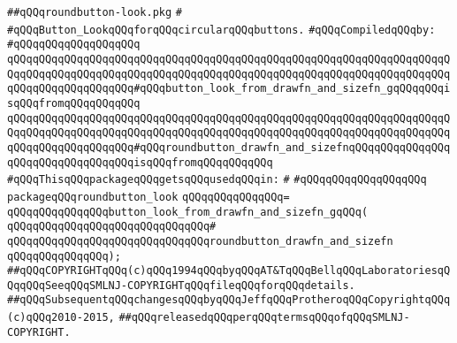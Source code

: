 \label{src/lib/x-kit/widget/old/leaf/roundbutton-look.pkg}
\verb|##qQQqroundbutton-look.pkg|\newline
\verb|#|\newline
\verb|#qQQqButton_LookqQQqforqQQqcircularqQQqbuttons.|\newline
\newline
\verb|#qQQqCompiledqQQqby:|\newline
\verb|#qQQqqQQqqQQqqQQqqQQq|\newline
\newline
\newline
\newline
\verb|qQQqqQQqqQQqqQQqqQQqqQQqqQQqqQQqqQQqqQQqqQQqqQQqqQQqqQQqqQQqqQQqqQQqqQQqqQQqqQQqqQQqqQQqqQQqqQQqqQQqqQQqqQQqqQQqqQQqqQQqqQQqqQQqqQQqqQQqqQQqqQQqqQQqqQQqqQQqqQQq#qQQqbutton_look_from_drawfn_and_sizefn_gqQQqqQQqisqQQqfromqQQqqQQqqQQq|\newline
\verb|qQQqqQQqqQQqqQQqqQQqqQQqqQQqqQQqqQQqqQQqqQQqqQQqqQQqqQQqqQQqqQQqqQQqqQQqqQQqqQQqqQQqqQQqqQQqqQQqqQQqqQQqqQQqqQQqqQQqqQQqqQQqqQQqqQQqqQQqqQQqqQQqqQQqqQQqqQQqqQQq#qQQqroundbutton_drawfn_and_sizefnqQQqqQQqqQQqqQQqqQQqqQQqqQQqqQQqqQQqisqQQqfromqQQqqQQqqQQq|\newline
\verb|#qQQqThisqQQqpackageqQQqgetsqQQqusedqQQqin:|\newline
\verb|#|\newline
\verb|#qQQqqQQqqQQqqQQqqQQq|\newline
\newline
\verb|packageqQQqroundbutton_look|\newline
\verb|qQQqqQQqqQQqqQQq=|\newline
\verb|qQQqqQQqqQQqqQQqbutton_look_from_drawfn_and_sizefn_gqQQq(|\newline
\verb|qQQqqQQqqQQqqQQqqQQqqQQqqQQqqQQq#|\newline
\verb|qQQqqQQqqQQqqQQqqQQqqQQqqQQqqQQqroundbutton_drawfn_and_sizefn|\newline
\verb|qQQqqQQqqQQqqQQq);|\newline
\newline
\newline
\verb|##qQQqCOPYRIGHTqQQq(c)qQQq1994qQQqbyqQQqAT&TqQQqBellqQQqLaboratoriesqQQqqQQqSeeqQQqSMLNJ-COPYRIGHTqQQqfileqQQqforqQQqdetails.|\newline
\verb|##qQQqSubsequentqQQqchangesqQQqbyqQQqJeffqQQqProtheroqQQqCopyrightqQQq(c)qQQq2010-2015,|\newline
\verb|##qQQqreleasedqQQqperqQQqtermsqQQqofqQQqSMLNJ-COPYRIGHT.|\newline

